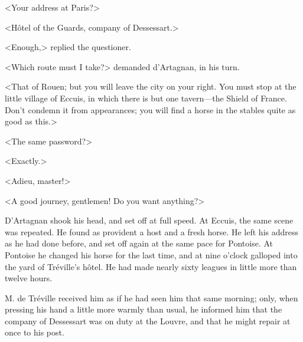 <Your address at Paris?> 

<Hôtel of the Guards, company of Dessessart.> 

<Enough,> replied the questioner. 

<Which route must I take?> demanded d'Artagnan, in his turn. 

<That of Rouen; but you will leave the city on your right. You must stop at the little village of Eccuis, in which there is but one tavern---the Shield of France. Don't condemn it from appearances; you will find a horse in the stables quite as good as this.> 

<The same password?> 

<Exactly.> 

<Adieu, master!> 

<A good journey, gentlemen! Do you want anything?> 

D'Artagnan shook his head, and set off at full speed. At Eccuis, the same scene was repeated. He found as provident a host and a fresh horse. He left his address as he had done before, and set off again at the same pace for Pontoise. At Pontoise he changed his horse for the last time, and at nine o'clock galloped into the yard of Tréville's hôtel. He had made nearly sixty leagues in little more than twelve hours. 

M. de Tréville received him as if he had seen him that same morning; only, when pressing his hand a little more warmly than usual, he informed him that the company of Dessessart was on duty at the Louvre, and that he might repair at once to his post. 